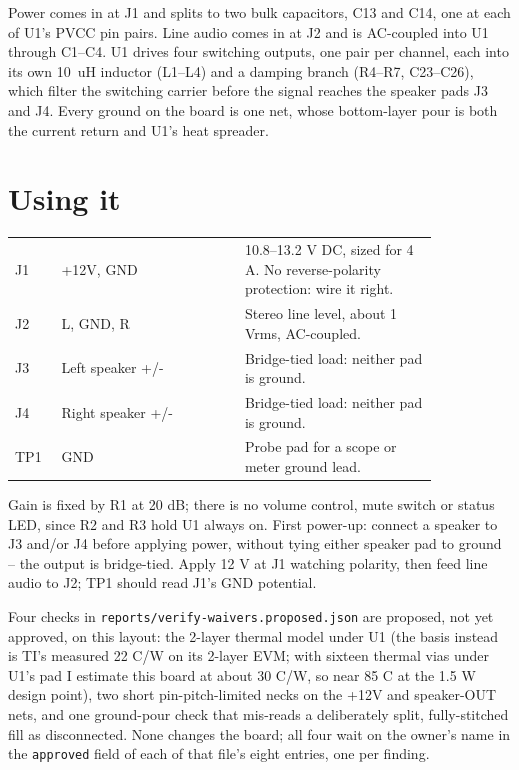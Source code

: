 Power comes in at J1 and splits to two bulk capacitors, C13 and C14, one at
each of U1's PVCC pin pairs. Line audio comes in at J2 and is AC-coupled into
U1 through C1--C4. U1 drives four switching outputs, one pair per channel,
each into its own 10~uH inductor (L1--L4) and a damping branch (R4--R7,
C23--C26), which filter the switching carrier before the signal reaches the
speaker pads J3 and J4. Every ground on the board is one net, whose
bottom-layer pour is both the current return and U1's heat spreader.

\section{Using it}
\label{sec:using}

\begin{hsblock}
\par\vspace{8pt}
{\small
\begin{tabular}{L{0.08\linewidth} L{0.37\linewidth} L{0.39\linewidth}}
\hstoprule
{} &  &  \\
\hline
J1 & +12V, GND & 10.8--13.2 V DC, sized for 4 A. No reverse-polarity
  protection: wire it right. \\
J2 & L, GND, R & Stereo line level, about 1 Vrms, AC-coupled. \\
J3 & Left speaker +/- & Bridge-tied load: neither pad is ground. \\
J4 & Right speaker +/- & Bridge-tied load: neither pad is ground. \\
TP1 & GND & Probe pad for a scope or meter ground lead. \\
\hline
\end{tabular}}
\end{hsblock}

Gain is fixed by R1 at 20 dB; there is no volume control, mute switch or
status LED, since R2 and R3 hold U1 always on. First power-up: connect a
speaker to J3 and/or J4 before applying power, without tying either speaker
pad to ground -- the output is bridge-tied. Apply 12 V at J1 watching
polarity, then feed line audio to J2; TP1 should read J1's GND potential.

Four checks in \texttt{reports/verify-waivers.proposed.json} are proposed,
not yet approved, on this layout: the 2-layer thermal model under U1 (the
basis instead is TI's measured 22 C/W on its 2-layer EVM; with sixteen
thermal vias under U1's pad I estimate this board at about 30 C/W, so near
85 C at the 1.5 W design point), two short
pin-pitch-limited necks on the +12V and speaker-OUT nets, and one ground-pour
check that mis-reads a deliberately split, fully-stitched fill as
disconnected. None changes the board; all four wait on the owner's name in the
\texttt{approved} field of each of that file's eight entries, one per finding.

